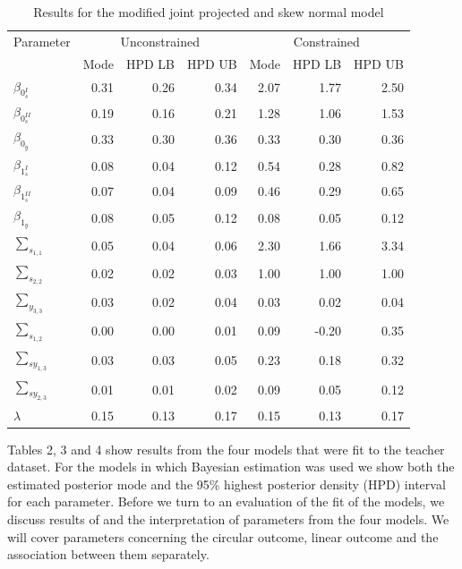 \documentclass[11pt,]{article}
\begin{document}
\begin{table}

\caption{\label{tab:estCLMGPN}Results for the modified joint projected and skew normal model}
\centering
\begin{tabular}[t]{lrrrrrr}
\toprule
\multicolumn{1}{c}{Parameter} & \multicolumn{3}{c}{Unconstrained} & \multicolumn{3}{c}{Constrained} \\
\cmidrule(l{2pt}r{2pt}){1-1} \cmidrule(l{2pt}r{2pt}){2-4} \cmidrule(l{2pt}r{2pt}){5-7}
  & Mode & HPD LB & HPD UB & Mode & HPD LB & HPD UB\\
\midrule
$\beta_{0_s^{I}}$ & 0.31 & 0.26 & 0.34 & 2.07 & 1.77 & 2.50\\
$\beta_{0_s^{II}}$ & 0.19 & 0.16 & 0.21 & 1.28 & 1.06 & 1.53\\
$\beta_{0_y}$ & 0.33 & 0.30 & 0.36 & 0.33 & 0.30 & 0.36\\
$\beta_{1_s^{I}}$ & 0.08 & 0.04 & 0.12 & 0.54 & 0.28 & 0.82\\
$\beta_{1_s^{II}}$ & 0.07 & 0.04 & 0.09 & 0.46 & 0.29 & 0.65\\
\addlinespace
$\beta_{1_y}$ & 0.08 & 0.05 & 0.12 & 0.08 & 0.05 & 0.12\\
$\sum_{s_{1,1}}$ & 0.05 & 0.04 & 0.06 & 2.30 & 1.66 & 3.34\\
$\sum_{s_{2,2}}$ & 0.02 & 0.02 & 0.03 & 1.00 & 1.00 & 1.00\\
$\sum_{y_{3,3}}$ & 0.03 & 0.02 & 0.04 & 0.03 & 0.02 & 0.04\\
$\sum_{s_{1,2}}$ & 0.00 & 0.00 & 0.01 & 0.09 & -0.20 & 0.35\\
\addlinespace
$\sum_{sy_{1,3}}$ & 0.03 & 0.03 & 0.05 & 0.23 & 0.18 & 0.32\\
$\sum_{sy_{2,3}}$ & 0.01 & 0.01 & 0.02 & 0.09 & 0.05 & 0.12\\
$\lambda$ & 0.15 & 0.13 & 0.17 & 0.15 & 0.13 & 0.17\\
\bottomrule
\end{tabular}
\end{table}

Tables 2, 3 and 4 show results from the four models that were fit to the
teacher dataset. For the models in which Bayesian estimation was used we
show both the estimated posterior mode and the 95\% highest posterior
density (HPD) interval for each parameter. Before we turn to an
evaluation of the fit of the models, we discuss results of and the
interpretation of parameters from the four models. We will cover
parameters concerning the circular outcome, linear outcome and the
association between them separately.
\end{document}
